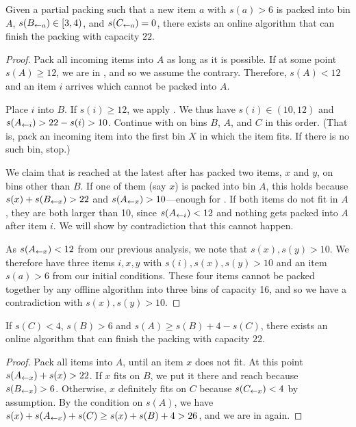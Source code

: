 \begin{goodsit}\label{lem:gs5}
Given a partial packing such that a new item $a$ with $s(a)>6$ is packed
into bin $A$, $s(B_{\leftarrow a}) \in [3,4)$, and $s(C_{\leftarrow a})=0$,
there exists an online algorithm that can finish the packing with capacity $22$.
\end{goodsit}

\begin{proof}
Pack all incoming items into $A$ as long as it is possible. 
If at some point $s(A) \geq 12$, we are in , and so we assume the contrary.
Therefore, $s(A) < 12$ and an item $i$ arrives which cannot be packed into $A$. 

Place $i$ into $B$. If $s(i) \geq 12$, we apply . We thus have
$s(i) \in (10,12)$ and $s(A_{\leftarrow i}) > 22 - s(i) > 10$. Continue with \FF
on bins $B$, $A$, and $C$ in this order. (That is, pack an incoming item into the first bin $X$
in which the item fits. If there is no such bin, stop.)

We claim that  is reached at the latest after \FF has
packed two items, $x$ and $y$, on bins other than $B$. If one of them (say $x$) is
packed into bin $A$, this holds because $s(x) + s(B_{\leftarrow x})>22$
and $s(A_{\leftarrow x})>10$---enough for .
If both items do not fit in $A$, they are both larger than 10, since $s(A_{\leftarrow i})<12$ and nothing gets packed into $A$ after item $i$.
We will show by contradiction that this cannot happen.

As $s(A_{\leftarrow x}) < 12$ from our previous analysis, we note that $s(x), s(y) > 10$.
We therefore have three items $i,x,y$ with $s(i),s(x),s(y)>10$ and
an item $s(a) > 6$ from our initial conditions. These four items
cannot be packed together by any offline algorithm into three bins of
capacity 16, and so we have a contradiction with $s(x), s(y) > 10$.
\end{proof}

\begin{goodsit}\label{lem:gs6} 
If $s(C)<4$, $s(B)>6$ and $s(A)\ge s(B)+ 4-s(C)$, 
there exists an online algorithm that can finish the packing with capacity $22$.
\end{goodsit}

\begin{proof}
Pack all items into $A$, until an item $x$ does not
fit.  At this point $s(A_{\leftarrow x})+s(x)>22$.  If $x$ fits on $B$, we put it there
and reach  because $s(B_{\leftarrow x})>6$. Otherwise, $x$ definitely fits on $C$
because $s(C_{\leftarrow x})<4$ by assumption.  By the condition on $s(A)$, we have %
$s(x) + s(A_{\leftarrow x})+ s(C) \ge s(x) + s(B)+4>26$, and we are in  again.
\end{proof}

